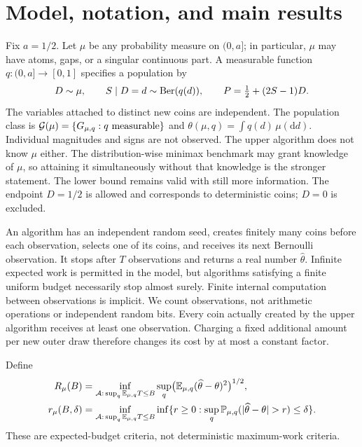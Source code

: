 \section{Model, notation, and main results}\label{sec:model}
Fix $a=1/2$. Let $\mu$ be any probability measure on $(0,a]$; in particular,
$\mu$ may have atoms, gaps, or a singular continuous part. A measurable
function $q:(0,a]\to[0,1]$ specifies a population by
\begin{equation}\label{eq:model}
 D\sim\mu,\qquad S\mid D=d\sim\operatorname{Ber}(q(d)),\qquad
 P=\tfrac12+(2S-1)D.
\end{equation}
The variables attached to distinct new coins are independent. The
population class is $\mathcal G(\mu)=\{G_{\mu,q}:q\text{ measurable}\}$ and
$\theta(\mu,q)=\int q(d)\,\mu(\mathrm d d)$.
Individual magnitudes and signs are not observed. The upper algorithm does
not know $\mu$ either. The distribution-wise minimax benchmark may grant
knowledge of $\mu$, so attaining it simultaneously without that knowledge
is the stronger statement. The lower bound remains valid with still more
information. The endpoint $D=1/2$ is allowed and corresponds to deterministic
coins; $D=0$ is excluded.

An algorithm has an independent random seed, creates finitely many coins
before each observation, selects one of its coins, and receives its next
Bernoulli observation. It stops after $T$ observations and returns a real
number $\widehat\theta$. Infinite expected work is permitted in the model,
but algorithms satisfying a finite uniform budget necessarily stop almost
surely. Finite internal computation between observations is implicit.
We count observations, not arithmetic operations or independent random bits.
Every coin actually created by the upper algorithm receives at least one
observation. Charging a fixed additional amount per new outer draw therefore
changes its cost by at most a constant factor.

Define
\begin{align}
 R_\mu(B)&=\inf_{\cA:\,\sup_q\E_{\mu,q}T\le B}
       \sup_q\bigl(\E_{\mu,q}(\widehat\theta-\theta)^2\bigr)^{1/2},
       \label{eq:risk}\\
 r_\mu(B,\delta)&=\inf_{\cA:\,\sup_q\E_{\mu,q}T\le B}
   \inf\{r\ge0:\sup_q\Prob_{\mu,q}(|\widehat\theta-\theta|>r)\le\delta\}.
       \label{eq:confidence-risk}
\end{align}
These are expected-budget criteria, not deterministic maximum-work criteria.


